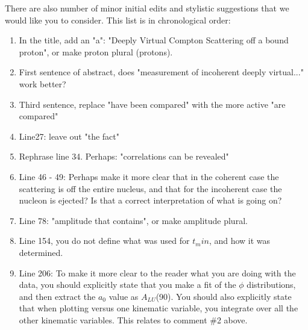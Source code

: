 \documentclass[a4paper,11pt,twoside]{article}
\begin{document}
There are also number of minor initial edits and stylistic suggestions that we 
would like you to consider. This list is in chronological order:

\begin{enumerate}
  
\item    In the title, add an "a":  "Deeply Virtual Compton Scattering off a bound proton", or make proton plural (protons).\\
   \textcolor{blue}{ }

\item    First sentence of abstract, does "measurement of incoherent deeply 
   virtual..." work better?\\
   \textcolor{blue}{ }

\item    Third sentence, replace "have been compared" with the more active "are compared"\\
   \textcolor{blue}{ }

\item    Line27: leave out "the fact"\\
   \textcolor{blue}{ }

\item    Rephrase line 34. Perhaps:  "correlations can be revealed"\\
   \textcolor{blue}{ }

\item    Line 46 - 49: Perhaps make it more clear that in the coherent case the scattering is off the entire nucleus, and that for the incoherent case the nucleon is ejected? Is that a correct interpretation of what is going on?\\
   \textcolor{blue}{ }

\item    Line 78: "amplitude that contains", or make amplitude plural.\\
   \textcolor{blue}{ }

\item    Line 154, you do not define what was used for $t_min$, and how it was 
   determined.\\
   \textcolor{blue}{ }

\item    Line 206: To make it more clear to the reader what you are doing with 
   the data, you should explicitly state that you make a fit of the $\phi$ 
      distributions, and then extract the $a_0$ value as $A_{LU}$(90). You 
      should also explicitly state that when plotting versus one kinematic 
      variable, you integrate over all the other kinematic variables. This 
      relates to comment \#2 above.\\
   \textcolor{blue}{ }


\end{enumerate}
\end{document}
